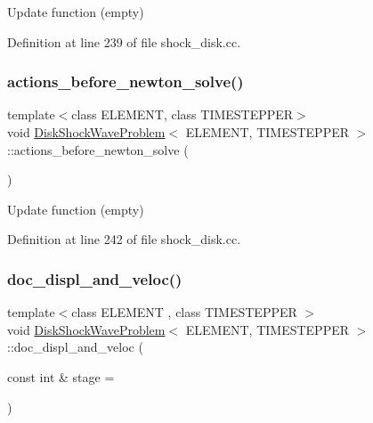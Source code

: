 Update function (empty) 



Definition at line 239 of file shock\+\_\+disk.\+cc.

\mbox{\label{classDiskShockWaveProblem_a50ba8e9b29ff7796fa9cb7ede8598376}} 
\subsubsection{\texorpdfstring{actions\+\_\+before\+\_\+newton\+\_\+solve()}{actions\_before\_newton\_solve()}}
{\footnotesize\ttfamily template$<$class E\+L\+E\+M\+E\+NT, class T\+I\+M\+E\+S\+T\+E\+P\+P\+ER$>$ \\
void \hyperlink{classDiskShockWaveProblem}{Disk\+Shock\+Wave\+Problem}$<$ E\+L\+E\+M\+E\+NT, T\+I\+M\+E\+S\+T\+E\+P\+P\+ER $>$\+::actions\+\_\+before\+\_\+newton\+\_\+solve (\begin{DoxyParamCaption}{ }\end{DoxyParamCaption})\hspace{0.3cm}{\ttfamily [inline]}}



Update function (empty) 



Definition at line 242 of file shock\+\_\+disk.\+cc.

\mbox{\label{classDiskShockWaveProblem_a75403423b0a031adabb5b487fa88373f}} 
\subsubsection{\texorpdfstring{doc\+\_\+displ\+\_\+and\+\_\+veloc()}{doc\_displ\_and\_veloc()}}
{\footnotesize\ttfamily template$<$class E\+L\+E\+M\+E\+NT , class T\+I\+M\+E\+S\+T\+E\+P\+P\+ER $>$ \\
void \hyperlink{classDiskShockWaveProblem}{Disk\+Shock\+Wave\+Problem}$<$ E\+L\+E\+M\+E\+NT, T\+I\+M\+E\+S\+T\+E\+P\+P\+ER $>$\+::doc\+\_\+displ\+\_\+and\+\_\+veloc (\begin{DoxyParamCaption}\item[{const int \&}]{stage = {} }\end{DoxyParamCaption})}



